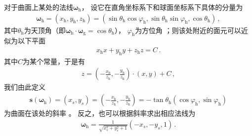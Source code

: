 对于曲面上某处的法线${\bm\omega}_{\mathrm{h}}$，
设它在直角坐标系下和球面坐标系下具体的分量为
\begin{align}
    {\bm\omega}_{\mathrm{h}}=(x_{\mathrm{h}},y_{\mathrm{h}},z_{\mathrm{h}})
    =(\sin\theta_{\mathrm{h}}\cos\varphi_{\mathrm{h}},\sin\theta_{\mathrm{h}}\sin\varphi_{\mathrm{h}},\cos\theta_{\mathrm{h}})\, ,
\end{align}
其中$\theta_{\mathrm{h}}$为天顶角（即${\bm\omega}_{\mathrm{h}}\cdot{\bm\omega}_{\mathrm{g}}=\cos\theta_{\mathrm{h}}$），
$\varphi_{\mathrm{h}}$为方位角
；则该处附近的面元可以近似为以下平面
\begin{align}
    x_{\mathrm{h}}x+y_{\mathrm{h}}y+z_{\mathrm{h}}z=C\, .
\end{align}
其中$C$为某个常量，于是有
\begin{align}
    z=\left(-\frac{x_{\mathrm{h}}}{z_{\mathrm{h}}},
    -\frac{y_{\mathrm{h}}}{z_{\mathrm{h}}}\right)\cdot(x,y)+C\, ,
\end{align}
我们由此定义
\begin{align}\label{eq:08-ex01-slope-of-surface}
    {\bm s}({\bm\omega}_{\mathrm{h}})=(x_s,y_s)
    =\left(-\frac{x_{\mathrm{h}}}{z_{\mathrm{h}}},
    -\frac{y_{\mathrm{h}}}{z_{\mathrm{h}}}\right)
    =-\tan\theta_{\mathrm{h}}(\cos\varphi_{\mathrm{h}},\sin\varphi_{\mathrm{h}})
\end{align}
为曲面在该处的斜率
。
反之，也可以根据斜率求出相应法线为
\begin{align}\label{eq:08-ex01-normals-by-slope}
    {\bm\omega}_{\mathrm{h}}=\frac{1}{\sqrt{x_s^2+y_s^2+1}}(-x_s,-y_s,1)\, .
\end{align}

